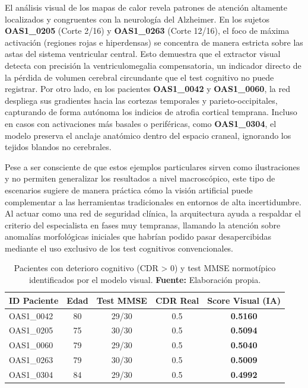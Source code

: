 \documentclass[12pt, oneside, english, spanish]{book}
\begin{document}
El análisis visual de los mapas de calor revela patrones de atención altamente localizados y congruentes con la neurología del Alzheimer. En los sujetos \textbf{OAS1\_0205} (Corte 2/16) y \textbf{OAS1\_0263} (Corte 12/16), el foco de máxima activación (regiones rojas e hiperdensas) se concentra de manera estricta sobre las astas del sistema ventricular central. Esto demuestra que el extractor visual detecta con precisión la ventriculomegalia compensatoria, un indicador directo de la pérdida de volumen cerebral circundante que el test cognitivo no puede registrar. Por otro lado, en los pacientes \textbf{OAS1\_0042} y \textbf{OAS1\_0060}, la red despliega sus gradientes hacia las cortezas temporales y parieto-occipitales, capturando de forma autónoma los indicios de atrofia cortical temprana. Incluso en casos con activaciones más basales o periféricas, como \textbf{OAS1\_0304}, el modelo preserva el anclaje anatómico dentro del espacio craneal, ignorando los tejidos blandos no cerebrales.

Pese a ser consciente de que estos ejemplos particulares sirven como ilustraciones y no permiten generalizar los resultados a nivel macroscópico, este tipo de escenarios sugiere de manera práctica cómo la visión artificial puede complementar a las herramientas tradicionales en entornos de alta incertidumbre. Al actuar como una red de seguridad clínica, la arquitectura ayuda a respaldar el criterio del especialista en fases muy tempranas, llamando la atención sobre anomalías morfológicas iniciales que habrían podido pasar desapercibidas mediante el uso exclusivo de los test cognitivos convencionales.

\begin{table}[htpb]
	\centering
	\caption[Top 5 casos clínicos de "Efecto Techo"] {Pacientes con deterioro cognitivo (CDR > 0) y test MMSE normotípico identificados por el modelo visual. \textbf{Fuente:}  Elaboración propia.}
	\label{tab:casos_rescate}
	\small   
	\setlength{\tabcolsep}{8pt}  
	\begin{tabular}{lcccc}
		\toprule
		\textbf{ID Paciente} & \textbf{Edad} & \textbf{Test MMSE} & \textbf{CDR Real} & \textbf{Score Visual (IA)} \\ \midrule
		OAS1\_0042 & 80 & 29/30 & 0.5 & \textbf{0.5160} \\
		OAS1\_0205 & 75 & 30/30 & 0.5 & \textbf{0.5094} \\
		OAS1\_0060 & 79 & 29/30 & 0.5 & \textbf{0.5040} \\
		OAS1\_0263 & 79 & 30/30 & 0.5 & \textbf{0.5009} \\
		OAS1\_0304 & 84 & 29/30 & 0.5 & \textbf{0.4992} \\ \bottomrule
	\end{tabular}
\end{table}
\end{document}
